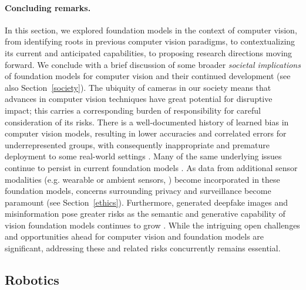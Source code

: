 \paragraph{Concluding remarks.} In this section, we explored foundation models in the context of computer vision, from identifying roots in previous computer vision paradigms, to contextualizing its current and anticipated capabilities, to proposing research directions moving forward. We conclude with a brief discussion of some broader \textit{societal implications} of foundation models for computer vision and their continued development (see also Section~\ref{society}).
The ubiquity of cameras in our society means that advances in computer vision techniques have great potential for disruptive impact; this carries a corresponding burden of responsibility for careful consideration of its risks. There is a well-documented history of learned bias in computer vision models, resulting in lower accuracies and correlated errors for underrepresented groups, with consequently inappropriate and premature deployment to some real-world settings \citep[e.g. ][Section~\ref{fairness}]{buolamwini2018gender}. 
Many of the same underlying issues continue to persist in current foundation models \cite{agarwal2021evaluating}. As data from additional sensor modalities (e.g. wearable or ambient sensors, ) become incorporated in these foundation models, concerns surrounding privacy and surveillance become paramount (see Section~\ref{ethics}).
Furthermore, generated deepfake images and misinformation pose greater risks as the semantic and generative capability of vision foundation models continues to grow \citep[][Section~\ref{misuse}]{dolhansky2020deepfake,ramesh2021zeroshot}.
While the intriguing open challenges and opportunities ahead for computer vision and foundation models are significant, addressing these and related risks concurrently remains essential.

\newsection
\subsection{Robotics}
\label{sec:robotics}

\newcommand*{\eperceive}{\textcolor{orange}}
\newcommand*{\jean}{\textcolor{teal}}

